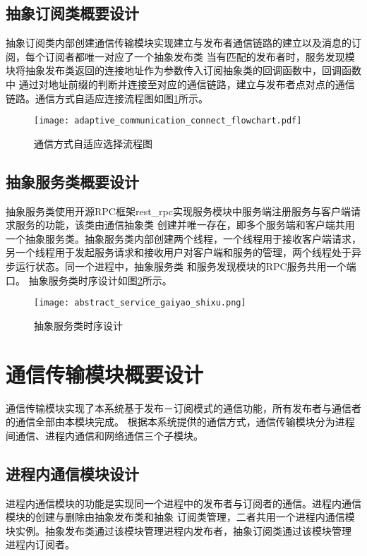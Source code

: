 \subsection{抽象订阅类概要设计}
抽象订阅类内部创建通信传输模块实现建立与发布者通信链路的建立以及消息的订阅，每个订阅者都唯一对应了一个抽象发布类
当有匹配的发布者时，服务发现模块将抽象发布类返回的连接地址作为参数传入订阅抽象类的回调函数中，回调函数中
通过对地址前缀的判断并连接至对应的通信链路，建立与发布者点对点的通信链路。通信方式自适应连接流程图如图\ref{adaptive_communication_connect_flowchart}所示。
\begin{figure}[H]
  \centering
  \texttt{[image: adaptive\_communication\_connect\_flowchart.pdf]}
  \caption{通信方式自适应选择流程图}
  \label{adaptive_communication_connect_flowchart}
\end{figure}

\subsection{抽象服务类概要设计}
抽象服务类使用开源RPC框架rest\_rpc实现服务模块中服务端注册服务与客户端请求服务的功能，该类由通信抽象类
创建并唯一存在，即多个服务端和客户端共用一个抽象服务类。抽象服务类内部创建两个线程，一个线程用于接收客户端请求，
另一个线程用于发起服务请求和接收用户对客户端和服务的管理，两个线程处于异步运行状态。同一个进程中，抽象服务类
和服务发现模块的RPC服务共用一个端口。
抽象服务类时序设计如图\ref{abstract_service_gaiyao_shixu}所示。
\begin{figure}[H]
  \centering
  \texttt{[image: abstract\_service\_gaiyao\_shixu.png]}
  \caption{抽象服务类时序设计}
  \label{abstract_service_gaiyao_shixu}
\end{figure}

\section{通信传输模块概要设计}
通信传输模块实现了本系统基于发布－订阅模式的通信功能，所有发布者与通信者的通信全部由本模块完成。
根据本系统提供的通信方式，通信传输模块分为进程间通信、进程内通信和网络通信三个子模块。

\subsection{进程内通信模块设计}
进程内通信模块的功能是实现同一个进程中的发布者与订阅者的通信。进程内通信模块的创建与删除由抽象发布类和抽象
订阅类管理，二者共用一个进程内通信模块实例。抽象发布类通过该模块管理进程内发布者，抽象订阅类通过该模块管理
进程内订阅者。

